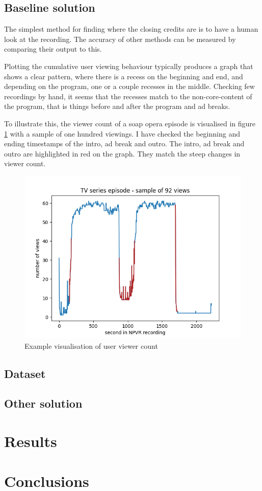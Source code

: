 \subsection{Baseline solution} \label{subsec:baseline}

The simplest method for finding where the closing credits are %
is to have a human look at the recording. The accuracy of other methods can be measured by comparing their output to this.

Plotting the cumulative user viewing behaviour typically produces a graph that shows a clear pattern, where there is a recess on the beginning and end, and depending on the program, one or a couple recesses in the middle. Checking few recordings by hand, it seems that the recesses match to the non-core-content of the program, that is things before and after the program and ad breaks.

To illustrate this, the viewer count of a soap opera episode is visualised in figure \ref{fig:intro_ads_outro} with a sample of one hundred viewings. I have checked the beginning and ending timestamps of the intro, ad break and outro. The intro, ad break and outro are highlighted in red on the graph. %
They match the steep changes in viewer count.

\begin{figure}[H]
\centering
\includegraphics[width=1\textwidth]{../plots/episode.png}
\caption{Example visualisation of user viewer count}
\label{fig:intro_ads_outro}
\end{figure}

\subsection{Dataset} \label{subsec:data}

\subsection{Other solution} \label{subsec:solution}

\section{Results} \label{sec:results}

\section{Conclusions} \label{sec:conclusions}
